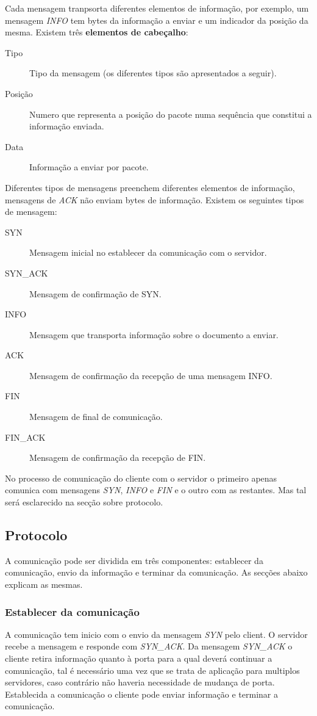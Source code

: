 \documentclass{llncs}
\begin{document}
Cada mensagem tranpsorta diferentes elementos de informação, por exemplo, um mensagem \textit{INFO} tem bytes da informação a enviar e um indicador da posição da mesma. Existem três \textbf{elementos de cabeçalho}:


\begin{description}
	\item[Tipo] 	Tipo da mensagem (os diferentes tipos são apresentados a seguir).
	\item[Posição] 	Numero que representa a posição do pacote numa sequência que constitui a informação enviada.
	\item[Data] 	Informação a enviar por pacote.
\end{description}


Diferentes tipos de mensagens preenchem diferentes elementos de informação, mensagens de \textit{ACK} não enviam bytes de informação. Existem os seguintes tipos de mensagem:


\begin{description}
	\item[SYN] Mensagem inicial no establecer da comunicação com o servidor.
	\item[SYN\_ACK] Mensagem de confirmação de SYN.
	\item[INFO] Mensagem que transporta informação sobre o documento a enviar.
	\item[ACK] Mensagem de confirmação da recepção de uma mensagem INFO.
	\item[FIN] Mensagem de final de comunicação.
	\item[FIN\_ACK] Mensagem de confirmação da recepção de FIN.
\end{description}


No processo de comunicação do cliente com o servidor o primeiro apenas comunica com mensagens \textit{SYN}, \textit{INFO} e \textit{FIN} e o outro com as restantes. Mas tal será esclarecido na secção sobre protocolo.


\subsection{Protocolo}
A comunicação pode ser dividida em três componentes: establecer da comunicação, envio da informação e terminar da comunicação. As secções abaixo explicam as mesmas.

\subsubsection{Establecer da comunicação}
A comunicação tem inicio com o envio da mensagem \textit{SYN} pelo client. O servidor recebe a mensagem e responde com \textit{SYN\_ACK}. Da mensagem \textit{SYN\_ACK} o cliente retira informação quanto à porta para a qual deverá continuar a comunicação, tal é necessário uma vez que se trata de aplicação para multiplos servidores, caso contrário não haveria necessidade de mudança de porta. Establecida a comunicação o cliente pode enviar informação e terminar a comunicação.
\end{document}
